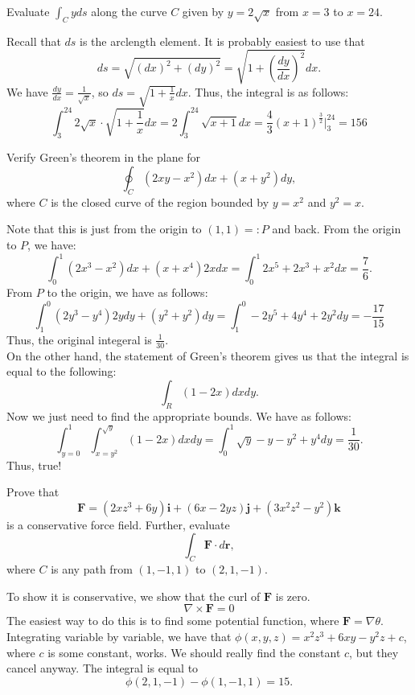 \begin{exercise}
Evaluate $\int_C yds$ along the curve $C$ given by $y = 2\sqrt{x}$
from $x = 3$ to $x = 24$.
\end{exercise}
\begin{solution}
Recall that $ds$ is the arclength element. It is probably easiest to use that
\[
ds = \sqrt{(dx)^2 + (dy)^2} = \sqrt{1 + \left(\frac{dy}{dx}\right)^2}dx.
\]
We have $\frac{dy}{dx} = \frac{1}{\sqrt{x}}$, so $ds = \sqrt{1 + \frac{1}{x}}dx$.
Thus, the integral is as follows:
\[
\int_3^{24} 2\sqrt{x} \cdot \sqrt{1 + \frac{1}{x}} dx
= 2\int_3^{24} \sqrt{x + 1} dx
= \frac{4}{3}(x + 1)^{\frac{3}{2}}\bigg|_3^{24}
= 156
\]
\end{solution}

\begin{exercise}
Verify Green's theorem in the plane for
\[
\oint_C (2xy-x^2) dx+(x+y^2) dy,
\]
where $C$ is the closed curve of the region bounded by $y=x^2$ and $y^2=x$.
\end{exercise}
\begin{solution}
Note that this is just from the origin to $(1,1)=:P$ and back. From the origin to $P$, we have:
\[
\int_0^1 (2x^3 - x^2)dx + (x + x^4)2xdx
= \int_0^1 2x^5 + 2x^3 + x^2 dx
= \frac{7}{6}.
\]
From $P$ to the origin, we have as follows:
\[
\int_1^0 (2y^3 - y^4) 2ydy + (y^2 + y^2)dy
= \int_1^0 -2y^5 + 4y^4 + 2y^2 dy
= -\frac{17}{15}
\]
Thus, the original integeral is $\frac{1}{30}$. \\

On the other hand, the statement of Green's theorem gives us that the 
integral is equal to the following:
\[
\int_R (1-2x)dxdy.
\]
Now we just need to find the appropriate bounds. We have as follows:
\[
\int_{y = 0}^1 \int_{x = y^2}^{\sqrt{y}} (1-2x)dxdy 
= \int_0^1 \sqrt{y} - y - y^2 + y^4 dy
= \frac{1}{30}.
\]
Thus, true!
\end{solution}


\begin{exercise}
Prove that
\[
\mathbf{F} = (2xz^3+6y)\mathbf{i} +(6x-2yz)\mathbf{j}
+(3x^2z^2-y^2)\mathbf{k}
\]
is a conservative force field. Further, evaluate
\[
\int_C \mathbf{F}\cdot d\mathbf{r},
\]
where $C$ is any path from $(1,-1,1)$ to $(2,1,-1)$.
\end{exercise}
\begin{solution}
To show it is conservative, we show that the curl of $\mathbf{F}$ is zero.
\[
\nabla \times \mathbf{F} = 0
\]
The easiest way to do this is to find some potential function, where
$\mathbf{F} = \nabla \theta$. Integrating variable by variable, we have that
$\phi(x,y,z) = x^2z^3 + 6xy - y^2z + c$, where $c$ is some constant, works.
We should really find the constant $c$, but they cancel anyway. The integral is
equal to 
\[
\phi(2,1,-1) - \phi(1,-1,1) = 15.
\]
\end{solution}

